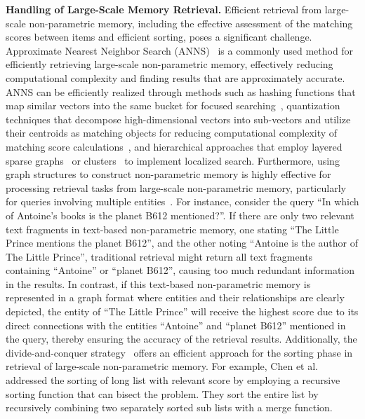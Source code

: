 \documentclass[journal,hideappendix]{vgtc}
\newenvironment{j_itemize}{
\begin{itemize}[]
  \setlength{\itemsep}{3pt}
  \setlength{\parskip}{0pt}
  \setlength{\parsep}{0pt}
}{\end{itemize}}
\begin{document}
\begin{j_itemize}

    \item[$\bullet$] \textbf{Handling of Large-Scale Memory Retrieval.} Efficient retrieval from large-scale non-parametric memory, including the effective assessment of the matching scores between items and efficient sorting, poses a significant challenge. Approximate Nearest Neighbor Search (ANNS)~\cite{arya1993approximate,indyk1998approximate,malkov2018efficient,spann2021chen} is a commonly used method for efficiently retrieving large-scale non-parametric memory, effectively reducing computational complexity and finding results that are approximately accurate. ANNS can be efficiently realized through methods such as hashing functions that map similar vectors into the same bucket for focused searching~\cite{datar2004locality}, quantization techniques that decompose high-dimensional vectors into sub-vectors and utilize their centroids as matching objects for reducing computational complexity of matching score calculations~\cite{jegou2010product,ge2013optimized}, and hierarchical approaches that employ layered sparse graphs~\cite{malkov2018efficient} or clusters~\cite{spann2021chen} to implement localized search. Furthermore, using graph structures to construct non-parametric memory is highly effective for processing retrieval tasks from large-scale non-parametric memory, particularly for queries involving multiple entities~\cite{gutierrez2024hipporag,edge2024local}. For instance, consider the query ``In which of Antoine's books is the planet B612 mentioned?''. If there are only two relevant text fragments in text-based non-parametric memory, one stating ``The Little Prince mentions the planet B612'', and the other noting ``Antoine is the author of The Little Prince'', traditional retrieval might return all text fragments containing ``Antoine'' or ``planet B612'', causing too much redundant information in the results. In contrast, if this text-based non-parametric memory is represented in a graph format where entities and their relationships are clearly depicted, the entity of ``The Little Prince'' will receive the highest score due to its direct connections with the entities ``Antoine'' and ``planet B612'' mentioned in the query, thereby ensuring the accuracy of the retrieval results. Additionally, the divide-and-conquer strategy~\cite{mishra2016divide,taiwo2020comparative} offers an efficient approach for the sorting phase in retrieval of large-scale non-parametric memory. For example, Chen et al.~\cite{billion2021johnson} addressed the sorting of long list with relevant score by employing a recursive sorting function that can bisect the problem. They sort the entire list by recursively combining two separately sorted sub lists with a merge function.


\end{j_itemize}
\end{document}

